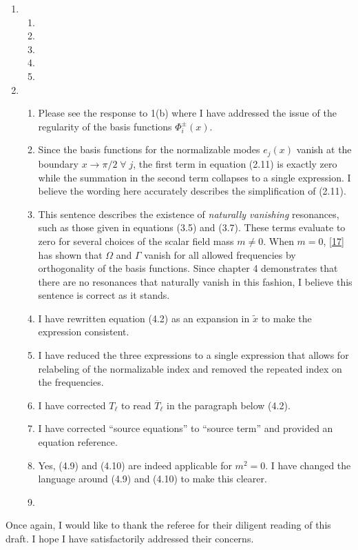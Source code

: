 \documentclass[11pt,letterpaper]{article}
\begin{document}
\begin{enumerate}
\begin{enumerate}
        \item 
    \end{enumerate}
    \item %
    \begin{enumerate}
        \item 
        \item 
        \item 
        \item 
        \item 
    \end{enumerate}
    \item %
    \begin{enumerate}
        \item Please see the response to 1(b) where I have addressed the issue of the regularity 
        of the basis functions $\Phi^\pm_i(x)$.
        \item Since the basis functions for the normalizable modes $e_j(x)$ vanish at the boundary
        ${x \to \pi/2 \; \forall \; j}$, the first term in equation (2.11) is exactly zero while the 
        summation in the second term collapses to a single expression. I believe the wording here 
        accurately describes the simplification of (2.11).
        \item This sentence describes the existence of \emph{naturally vanishing} resonances, such 
        as those given in equations (3.5) and (3.7). These terms evaluate to zero for several choices 
        of the scalar field mass $m \neq 0$. When $m = 0$, [\href{https://arxiv.org/pdf/1407.6273.pdf}{17}]
        has shown that $\Omega$ and $\Gamma$ vanish for all allowed frequencies by orthogonality of the 
        basis functions. Since chapter 4 demonstrates that there are no resonances that naturally 
        vanish in this fashion, I believe this sentence is correct as it stands.
        \item I have rewritten equation (4.2) as an expansion in $\tilde x$ to make the expression consistent.
        \item I have reduced the three expressions to a single expression that allows for relabeling of the normalizable index and removed the repeated index on the frequencies.
        \item I have corrected $T_\ell$ to read $\overline{T}_\ell$ in the paragraph below (4.2).
        \item I have corrected ``source equations'' to ``source term'' and provided an equation reference.
        \item Yes, (4.9) and (4.10) are indeed applicable for $m^2 = 0$. I have changed the language around (4.9) and (4.10) to make this clearer.
        \item
    \end{enumerate}   
\end{enumerate}

Once again, I would like to thank the referee for their diligent reading of this draft. I hope I have satisfactorily addressed their concerns. 
\end{document}
